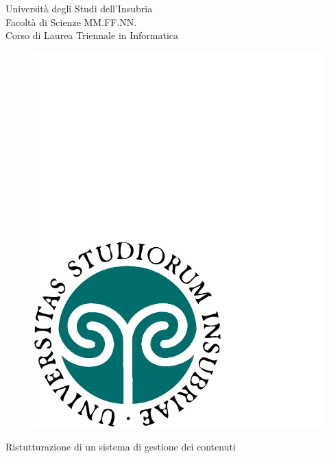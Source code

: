 \begin{titlepage}
  \begin{center}
  \begin{large}
  {\fontsize{20.74}{18}\selectfont\vspace*{0.50cm}Universit\`a degli Studi dell'Insubria}\\
  Facolt\`a di Scienze MM.FF.NN.\\
  Corso di Laurea Triennale in Informatica
  \end{large}
  
  \vspace{1cm}
  \begin{figure}[h]
    \begin{center}
      \includegraphics[scale=0.25]{copertina/logounivector.pdf}
    \end{center}
  \end{figure}

    {\fontsize{26}{26}\selectfont\par\vspace*{0.75cm}
    Ristutturazione di un sistema
    \vspace{.15em}di gestione dei contenuti}
    \par
    

\end{center}
\end{titlepage}

